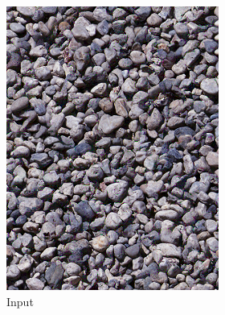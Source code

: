 \begin{figure}[]
    \centering    
    \begin{subfigure}{\textwidth}
        \centering
        \begin{subfigure}{0.24\textwidth}
            \centering
            \includegraphics[width=\textwidth]{images/04-experiment02/human/pebbles/target.jpg}
            \caption*{Input}
        \end{subfigure}
        \hfill
        \begin{subfigure}{0.24\textwidth}
            \centering

\end{subfigure}
\end{subfigure}
\end{figure}
